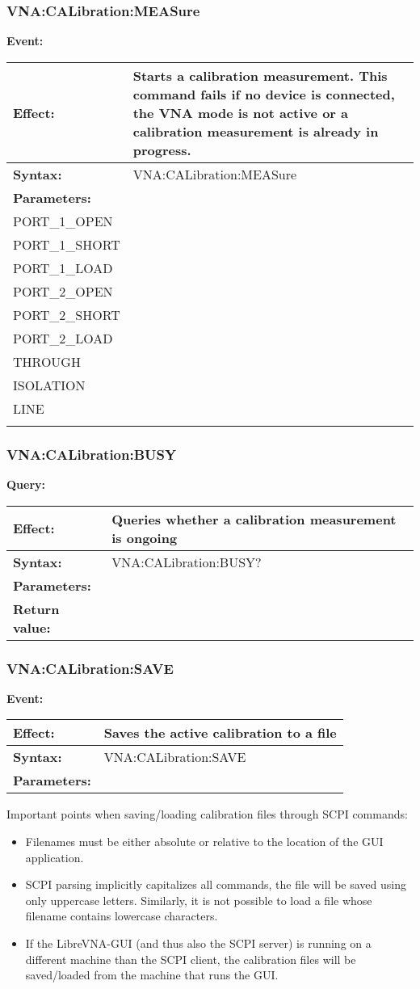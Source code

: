 \documentclass[a4paper,11pt]{article}
\newcommand{\event}[3]{
\noindent\textbf{Event:}
\begin{longtable}{p{.15\textwidth} | p{.80\textwidth} } 
\hline
\textbf{Effect:} & #1 \\ \hline
\textbf{Syntax:} & #2 \\ \hline 
\textbf{Parameters:} & \makecell[Xl]{#3} \\ \hline
\end{longtable}
}
\newcommand{\query}[4]{
\noindent\textbf{Query:}
\begin{longtable}{p{.15\textwidth} | p{.80\textwidth} } 
\hline
\textbf{Effect:} & #1 \\ \hline
\textbf{Syntax:} & #2 \\ \hline 
\textbf{Parameters:} & \makecell[tl]{#3} \\ \hline
\textbf{Return value:} & \makecell[tl]{#4} \\ \hline
\end{longtable}
}
\begin{document}
\subsubsection{VNA:CALibration:MEASure}
\event{Starts a calibration measurement. This command fails if no device is connected, the VNA mode is not active or a calibration measurement is already in progress.}{VNA:CALibration:MEASure}{<type>, options are:\\
\hspace{1cm}PORT\_1\_OPEN\\
\hspace{1cm}PORT\_1\_SHORT\\
\hspace{1cm}PORT\_1\_LOAD\\
\hspace{1cm}PORT\_2\_OPEN\\
\hspace{1cm}PORT\_2\_SHORT\\
\hspace{1cm}PORT\_2\_LOAD\\
\hspace{1cm}THROUGH\\
\hspace{1cm}ISOLATION\\
\hspace{1cm}LINE\\
}

\subsubsection{VNA:CALibration:BUSY}
\query{Queries whether a calibration measurement is ongoing}{VNA:CALibration:BUSY?}{None}{TRUE or FALSE}

\subsubsection{VNA:CALibration:SAVE}
\event{Saves the active calibration to a file}{VNA:CALibration:SAVE}{<filename>}
Important points when saving/loading calibration files through SCPI commands:
\begin{itemize}
\item Filenames must be either absolute or relative to the location of the GUI application.
\item SCPI parsing implicitly capitalizes all commands, the file will be saved using only uppercase letters. Similarly, it is not possible to load a file whose filename contains lowercase characters.
\item If the LibreVNA-GUI (and thus also the SCPI server) is running on a different machine than the SCPI client, the calibration files will be saved/loaded from the machine that runs the GUI.
\end{itemize}
\end{document}
